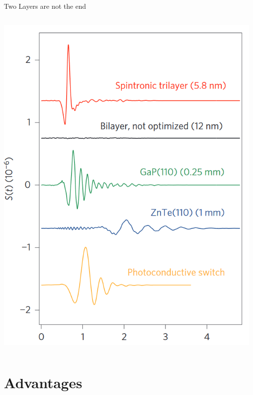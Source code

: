 \documentclass[aspectratio=1610, 9pt]{beamer}
\begin{document}
\begin{frame}{Two Layers are not the end}
\begin{center}
\begin{columns}
\begin{column}{.5\textwidth}
\begin{center}
        \includegraphics[width=.6\textwidth]{pics/vergleich.png}
      \end{center}
    \end{column}
  \end{columns}
  \vspace{0.3in}
\end{center}
\end{frame}

\section{Advantages}
\end{document}
